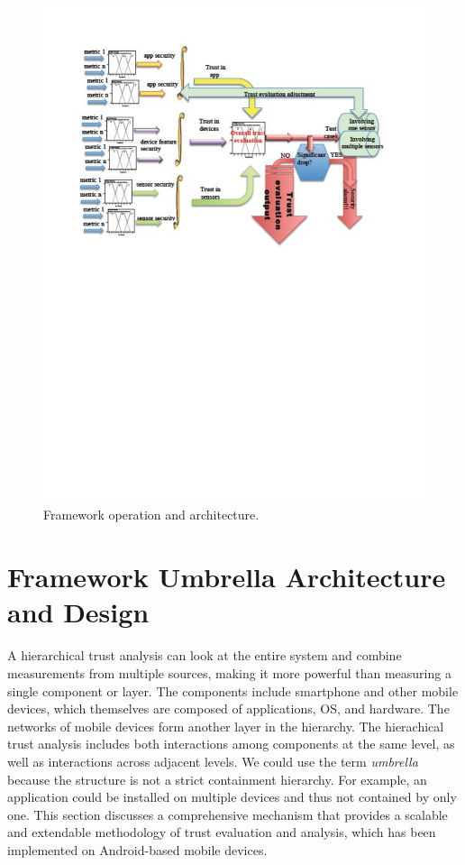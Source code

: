 \begin{figure}[ht]
\centering
\includegraphics[width=5.6in]{umbrella_framework.pdf}
\caption{Framework operation and architecture.}
\label{fig:umbrella}
\end{figure}

\section{Framework Umbrella Architecture and Design}\label{sec-umbrella}

A hierarchical trust analysis can look at the entire system and combine measurements from multiple sources, making
it more powerful than measuring a single component or layer.  The components include smartphone and other mobile
devices, which themselves are composed of applications, OS, and hardware. The networks of mobile devices form another 
layer in the hierarchy.  The hierachical trust analysis includes both interactions among components at the same level,
as well as interactions across adjacent levels.  We could use the term {\it umbrella} because the structure is not
a strict containment hierarchy.  For example, an application could be installed on multiple devices and thus not
contained by only one.
This section discusses a comprehensive mechanism that provides a scalable and extendable methodology of trust
 evaluation and analysis, which has been implemented on Android-based mobile devices.
 
